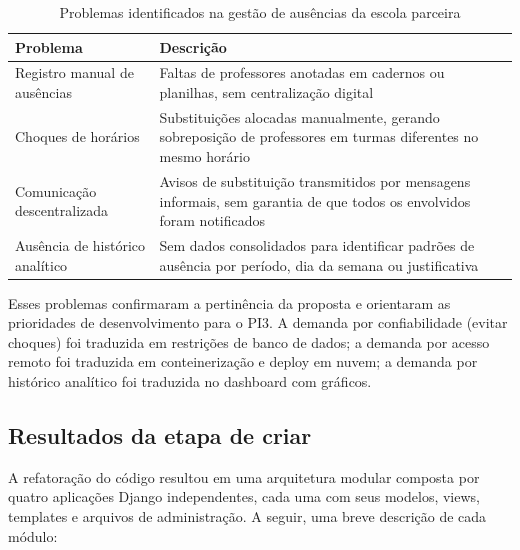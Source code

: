 \begin{table}[H]
\centering
\caption{Problemas identificados na gestão de ausências da escola parceira}
\label{tab:problemas}
\begin{tabular}{p{4cm}p{9cm}}
\toprule
\textbf{Problema} & \textbf{Descrição} \\
\midrule
Registro manual de ausências & Faltas de professores anotadas em cadernos ou planilhas, sem centralização digital \\
Choques de horários & Substituições alocadas manualmente, gerando sobreposição de professores em turmas diferentes no mesmo horário \\
Comunicação descentralizada & Avisos de substituição transmitidos por mensagens informais, sem garantia de que todos os envolvidos foram notificados \\
Ausência de histórico analítico & Sem dados consolidados para identificar padrões de ausência por período, dia da semana ou justificativa \\
\bottomrule
\end{tabular}
\end{table}

Esses problemas confirmaram a pertinência da proposta e orientaram as prioridades de desenvolvimento para o PI3. A demanda por confiabilidade (evitar choques) foi traduzida em restrições de banco de dados; a demanda por acesso remoto foi traduzida em conteinerização e deploy em nuvem; a demanda por histórico analítico foi traduzida no dashboard com gráficos.

\subsection{Resultados da etapa de criar}

A refatoração do código resultou em uma arquitetura modular composta por quatro aplicações Django independentes, cada uma com seus modelos, views, templates e arquivos de administração. A seguir, uma breve descrição de cada módulo:

